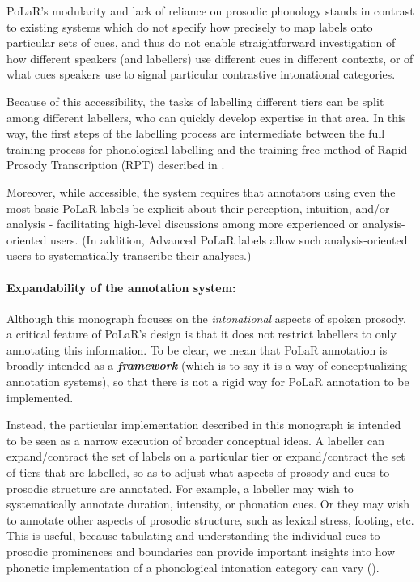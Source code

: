 \documentclass[11pt, twoside]{memoir}
\begin{document}
PoLaR’s modularity and lack of reliance on prosodic phonology stands in contrast to existing systems which do not specify how precisely to map labels onto particular sets of cues, and thus do not enable straightforward investigation of how different speakers (and labellers) use different cues in different contexts, or of what cues speakers use to signal particular contrastive intonational categories.

Because of this accessibility, the tasks of labelling different tiers can be split among different labellers, who can quickly develop expertise in that area.  In this way, the first steps of the labelling process are intermediate between the full training process for phonological labelling and the training-free method of Rapid Prosody Transcription (RPT) described in \citet{cole-14, cole-17}. 

Moreover, while accessible, the system requires that annotators using even the most basic PoLaR labels be explicit about their perception, intuition, and/or analysis - facilitating high-level discussions among more experienced or analysis-oriented users. (In addition, Advanced PoLaR labels allow such analysis-oriented users to systematically transcribe their analyses.)

\paragraph{Expandability of the annotation system:}
Although this monograph focuses on the \emph{intonational} aspects of spoken prosody, a critical feature of PoLaR’s design is that it does not restrict labellers to only annotating this information. To be clear, we mean that PoLaR annotation is broadly intended as a \emph{\textbf{framework}} (which is to say it is a way of conceptualizing annotation systems), so that there is not a rigid way for PoLaR annotation to be implemented. 

Instead, the particular implementation described in this monograph is intended to be seen as a narrow execution of broader conceptual ideas. A labeller can expand\slash contract the set of labels on a particular tier or expand\slash contract the set of tiers that are labelled, so as to adjust what aspects of prosody and cues to prosodic structure are annotated. For example, a labeller may wish to systematically annotate duration, intensity, or phonation cues. Or they may wish to annotate other aspects of prosodic structure, such as lexical stress, footing, etc. This is useful, because tabulating and understanding the individual cues to prosodic prominences and boundaries can provide important insights into how phonetic implementation of a phonological intonation category can vary (\citealt{brugos15, brugos-18}).
\end{document}
